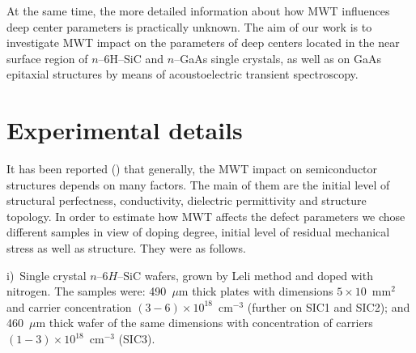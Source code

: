 \documentclass[final,3p,times,twocolumn,authoryear]{elsarticle}
\begin{document}
%


%
%




%




At the same time,
the more detailed information about how MWT influences deep center parameters is practically unknown.
The aim of our work is to investigate MWT impact on the parameters of deep centers located in the near surface region of $n$–6H–SiC and $n$–GaAs single crystals,
as well as on  GaAs  epitaxial structures by means of acoustoelectric  transient spectroscopy.


\section{Experimental details}\label{sec2}

It has been reported (\cite{BoltovetsEn,Milenin1994En,BelyaevIntac,ASHKINADZE1996,ProcSPIE}) that generally,
the MWT impact on semiconductor structures depends on many factors.
The main of them are the initial level of structural perfectness, conductivity, dielectric permittivity and structure topology.
In order to estimate how MWT affects the defect parameters we chose different samples in view of doping degree, initial level of residual mechanical stress as well as structure.
They were as follows.



\noindent
i)~Single crystal $n$--6$H$--SiC wafers, grown by Leli method and doped with nitrogen.
   The samples were:
    490~$\mu$m thick plates with dimensions $5\times10$~mm$^2$ and  carrier concentration $(3-6)\times10^{18}$~cm$^{-3}$
    (further on SIC1 and SIC2);
    and 460~$\mu$m thick wafer of the same dimensions with concentration of carriers $(1-3)\times10^{18}$~cm$^{-3}$ (SIC3).
\end{document}
